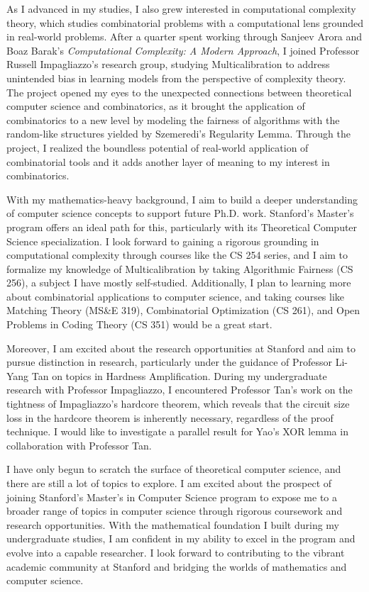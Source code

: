 \documentclass[12pt]{article}
\begin{document}
As I advanced in my studies, I also grew interested in computational complexity theory, which
studies combinatorial problems with a computational lens grounded in real-world problems. After a
quarter spent working through Sanjeev Arora and Boaz Barak's \textit{Computational Complexity: A
Modern Approach}\cite{arora2009computational}, I joined Professor Russell Impagliazzo's research
group, studying Multicalibration to address unintended bias in learning models from the perspective
of complexity theory. The project opened my eyes to the unexpected connections between theoretical
computer science and combinatorics, as it brought the application of combinatorics to a new level by
modeling the fairness of algorithms with the random-like structures yielded by Szemeredi's
Regularity Lemma. Through the project, I realized the boundless potential of real-world application
of combinatorial tools and it adds another layer of meaning to my interest in combinatorics.

With my mathematics-heavy background, I aim to build a deeper understanding of computer science
concepts to support future Ph.D. work. Stanford's Master's program offers an ideal path for this,
particularly with its Theoretical Computer Science specialization. I look forward to gaining a
rigorous grounding in computational complexity through courses like the CS 254 series, and I aim to
formalize my knowledge of Multicalibration by taking Algorithmic Fairness (CS 256), a subject I have
mostly self-studied. Additionally, I plan to learning more about combinatorial applications to
computer science, and taking courses like Matching Theory (MS\&E 319), Combinatorial Optimization
(CS 261), and Open Problems in Coding Theory (CS 351) would be a great start.

Moreover, I am excited about the research opportunities at Stanford and aim to pursue distinction in
research, particularly under the guidance of Professor Li-Yang Tan on topics in Hardness
Amplification. During my undergraduate research with Professor Impagliazzo, I encountered Professor
Tan's work on the tightness of Impagliazzo's hardcore
theorem\cite{blanc2024samplecomplexitysmoothboosting}, which reveals that the circuit size loss in
the hardcore theorem is inherently necessary, regardless of the proof technique. I would like to
investigate a parallel result for Yao's XOR lemma in collaboration with Professor Tan. 

I have only begun to scratch the surface of theoretical computer science, and there are still a lot
of topics to explore. I am excited about the prospect of joining Stanford's Master's in Computer
Science program to expose me to a broader range of topics in computer science through rigorous
coursework and research opportunities. With the mathematical foundation I built during my
undergraduate studies, I am confident in my ability to excel in the program and evolve into a
capable researcher. I look forward to contributing to the vibrant academic community at Stanford and
bridging the worlds of mathematics and computer science.

\newpage



\end{document}
